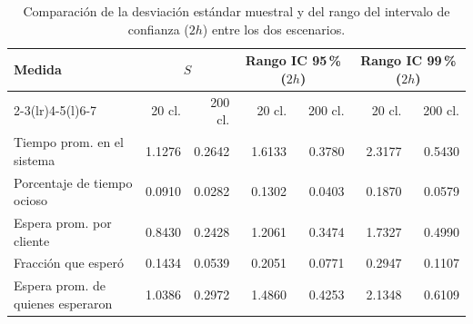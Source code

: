 \begin{table}[H]
\centering
\caption{Comparaci\'on de la desviaci\'on est\'andar muestral y del rango del intervalo de confianza ($2h$) entre los dos escenarios.}
\label{tab:resumen}
\footnotesize
\begin{tabular}{@{}lrrrrrr@{}}
\toprule
\multirow{2}{*}{Medida} & \multicolumn{2}{c}{$S$} & \multicolumn{2}{c}{Rango IC 95\,\% ($2h$)} & \multicolumn{2}{c}{Rango IC 99\,\% ($2h$)} \\
\cmidrule(lr){2-3}\cmidrule(lr){4-5}\cmidrule(l){6-7}
 & 20 cl. & 200 cl. & 20 cl. & 200 cl. & 20 cl. & 200 cl. \\
\midrule
Tiempo prom. en el sistema & 1.1276 & 0.2642 & 1.6133 & 0.3780 & 2.3177 & 0.5430 \\
Porcentaje de tiempo ocioso & 0.0910 & 0.0282 & 0.1302 & 0.0403 & 0.1870 & 0.0579 \\
Espera prom. por cliente & 0.8430 & 0.2428 & 1.2061 & 0.3474 & 1.7327 & 0.4990 \\
Fracci\'on que esper\'o & 0.1434 & 0.0539 & 0.2051 & 0.0771 & 0.2947 & 0.1107 \\
Espera prom. de quienes esperaron & 1.0386 & 0.2972 & 1.4860 & 0.4253 & 2.1348 & 0.6109 \\
\bottomrule
\end{tabular}
\end{table}